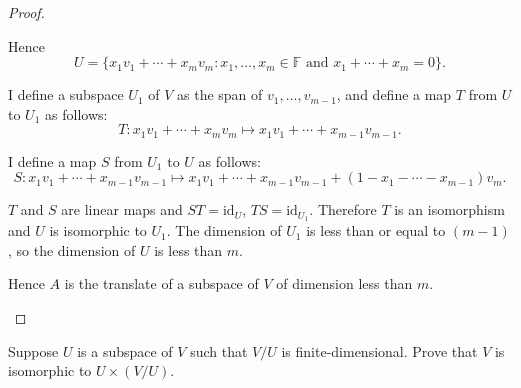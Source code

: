 \begin{proof}
\begin{enumerate}[label={(\alph*)}]
              Hence
              \[
                  U = \{ x_{1}v_{1} + \cdots + x_{m}v_{m} : x_{1}, \ldots, x_{m}\in \mathbb{F} \text{ and } x_{1} + \cdots + x_{m} = 0 \}.
              \]

              I define a subspace $U_{1}$ of $V$ as the span of $v_{1}, \ldots, v_{m-1}$, and define a map $T$ from $U$ to $U_{1}$ as follows:
              \[
                  T: x_{1}v_{1} + \cdots + x_{m}v_{m} \mapsto x_{1}v_{1} + \cdots + x_{m-1}v_{m-1}.
              \]

              I define a map $S$ from $U_{1}$ to $U$ as follows:
              \[
                  S: x_{1}v_{1} + \cdots + x_{m-1}v_{m-1} \mapsto x_{1}v_{1} + \cdots + x_{m-1}v_{m-1} + (1 - x_{1} - \cdots - x_{m-1})v_{m}.
              \]

              $T$ and $S$ are linear maps and $ST = \text{id}_{U}$, $TS = \text{id}_{U_{1}}$. Therefore $T$ is an isomorphism and $U$ is isomorphic to $U_{1}$. The dimension of $U_{1}$ is less than or equal to $(m - 1)$, so the dimension of $U$ is less than $m$.

              Hence $A$ is the translate of a subspace of $V$ of dimension less than $m$.
    \end{enumerate}
\end{proof}
\newpage

\begin{exercise}
    Suppose $U$ is a subspace of $V$ such that $V/U$ is finite-dimensional. Prove that $V$ is isomorphic to $U \times (V/U)$.
\end{exercise}

